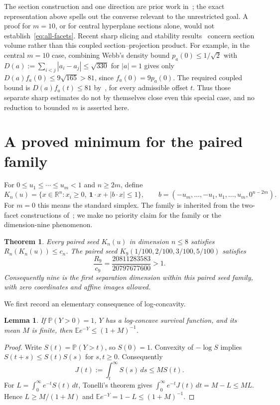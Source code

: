 \documentclass[11pt,a4paper]{article}
\newcommand{\E}{\mathbb E}
\newcommand{\PP}{\mathbb P}
\newtheorem{theorem}[proposition]{Theorem}
\newtheorem{lemma}[proposition]{Lemma}
\begin{document}
The section construction and one direction are prior work in~\cite{feng};
the exact representation above spells out the converse relevant to the
unrestricted goal. A proof for $m=10$, or for central hyperplane sections
alone, would not establish~\eqref{eq:all-facets}. Recent sharp slicing
and stability results~\cite{slicing-stability,restricted-slicing} concern
section volume rather than this coupled section--projection product.
For example, in the central $m=10$ case, combining Webb's density bound
$p_a(0)\le1/\sqrt2$ with
$D(a):=\sum_{i<j}|a_i-a_j|\le\sqrt{330}$ for $|a|=1$
gives only $D(a)f_a(0)\le9\sqrt{165}>81$, since $f_a(0)=9p_a(0)$.
The required coupled bound is $D(a)f_a(t)\le81$
by~\cite[Proposition 4.2]{feng}, for every admissible offset $t$.
Thus those separate sharp estimates do not by themselves close even
this special case, and no reduction to bounded $m$ is asserted here.

\section{A proved minimum for the paired family}
For $0\le u_1\le\cdots\le u_m<1$ and $n\ge2m$, define
\[
 K_n(u)=\{x\in\mathbb R^n:x_i\ge0,\
             \boldsymbol1\cdot x+|b\cdot x|\le1\},\qquad
 b=(-u_m,\ldots,-u_1,u_1,\ldots,u_m,0^{n-2m}).
\]
For $m=0$ this means the standard simplex. The family is inherited
from the two-facet constructions of~\cite{feng}; we make no priority
claim for the family or the dimension-nine phenomenon.

\begin{theorem}\label{thm:paired}
Every paired seed $K_n(u)$ in dimension $n\le8$ satisfies
$R_n(K_n(u))\le c_n$. The paired seed
$K_9(1/100,2/100,3/100,5/100)$ satisfies
\[
 \frac{R_9}{c_9}=\frac{20811283583}{20797677600}>1.
\]
Consequently nine is the first separation dimension within this paired
seed family, with zero coordinates and affine images allowed.
\end{theorem}

We first record an elementary consequence of log-concavity.
\begin{lemma}\label{lem:laplace}
If $\PP(Y>0)=1$, $Y$ has a log-concave survival function, and its mean
$M$ is finite, then $\E e^{-Y}\le(1+M)^{-1}$.
\end{lemma}
\begin{proof}
Write $S(t)=\PP(Y>t)$, so $S(0)=1$.
Convexity of $-\log S$ implies $S(t+s)\le S(t)S(s)$ for $s,t\ge0$.
Consequently
\[
 J(t):=\int_t^\infty S(s)\,ds\le M S(t).
\]
For $L=\int_0^\infty e^{-t}S(t)\,dt$, Tonelli's theorem gives
$\int_0^\infty e^{-t}J(t)\,dt=M-L\le ML$.
Hence $L\ge M/(1+M)$ and $\E e^{-Y}=1-L\le(1+M)^{-1}$.
\end{proof}
\end{document}
